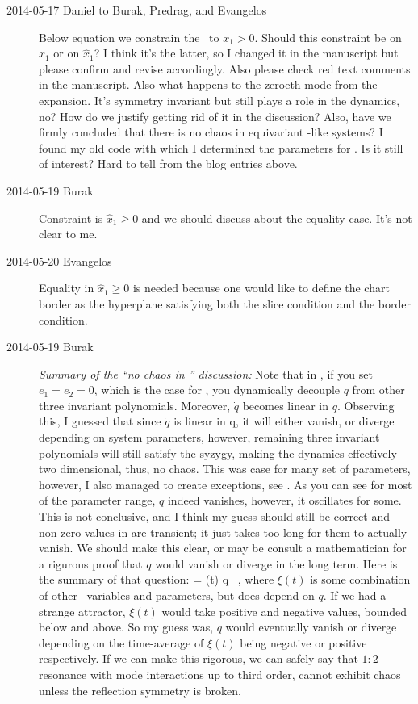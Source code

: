 \begin{description}
\item[2014-05-17 Daniel to Burak, Predrag, and Evangelos] Below equation 
we constrain the \slicePlane\ to $x_1 > 0$. Should this constraint be on $x_1$
or on $\hat{x}_1$? I think it's the latter, so I changed it in the manuscript but
please confirm and revise accordingly. Also please check red text comments in the
manuscript. Also what happens to the zeroeth mode from the expansion. It's symmetry
invariant but still plays a role in the dynamics, no? How do we justify getting
rid of it in the discussion? Also, have we firmly concluded that there is no chaos
in  equivariant \twomode-like systems? I found my old code with which I
determined the parameters for . Is it still of interest? Hard to tell from
the blog entries above.

\item[2014-05-19 Burak] Constraint is $\hat{x}_1 \geq 0$ and we should discuss
about the equality case. It's not clear to me.

\item[2014-05-20 Evangelos] Equality in $\hat{x}_1 \geq 0$ is needed because one
would like to define the chart border as the hyperplane satisfying both the slice condition
and the border condition.

\item[2014-05-19 Burak]
{\it Summary of the ``no chaos in '' discussion:} Note that in
, if you set $e_1 = e_2 = 0$, which is the case for ,
you dynamically decouple $q$ from other three invariant polynomials. Moreover,
$\dot{q}$ becomes linear in $q$. Observing this, I guessed that since $\dot{q}$
is linear in q, it will either vanish, or diverge depending on system parameters,
however, remaining three invariant polynomials will still satisfy the syzygy,
making the dynamics effectively two dimensional, thus, no chaos. This was case
for many set of parameters, however, I also managed to create exceptions, see
. As you can see for most of the parameter range,
$q$ indeed vanishes, however, it oscillates for some. This is not conclusive,
and I think my guess should still be correct and non-zero values in
 are transient; it just takes too long for them
to actually vanish. We should make this clear, or may be consult a mathematician
for a rigurous proof that $q$ would vanish or diverge in the long term. Here is
the summary of that question:
\beq
     = \xi (t) q \, , \label{e-qlinear}
\eeq
where $\xi (t)$ is some combination of other \statesp\ variables and
parameters, but does depend on $q$. If we had a strange attractor, $\xi (t)$
would take positive and negative values, bounded below and above. So my guess
was, $q$ would eventually vanish or diverge depending on the time-average of
$\xi (t)$ being negative or positive respectively. If we can make this rigorous,
we can safely say that $1:2$ resonance with mode interactions up to third order,
cannot exhibit chaos unless the reflection symmetry is broken.


\end{description}

